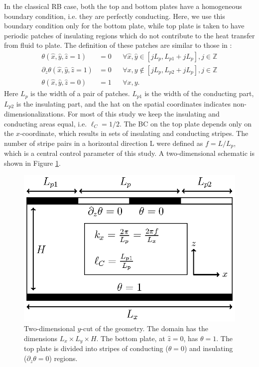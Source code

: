 \documentclass{jfm}
\begin{document}
In the classical RB case, both the top and bottom plates have a homogeneous
boundary condition, i.e. they are perfectly conducting. Here, we use this
boundary condition only for the bottom plate, while top plate is taken to have
periodic patches of insulating regions which do not contribute to the heat
transfer from fluid to plate. The definition of these patches are similar to
those in \cite{rip14}:
%
\begin{equation} \begin{aligned} \theta(\hat{x},\hat{y},\hat{z}=1) &= 0 &&
    \forall \hat{x},\hat{y} \in \left[ j L_p,L_{p1}+j L_p \right], j \in
    \mathbb{Z} \\ \partial_z \theta(\hat{x},\hat{y},\hat{z}=1)  &= 0 &&
    \forall x,y \notin \left[ j L_p,L_{p2}+j L_p \right], j \in \mathbb{Z} \\
    \theta(\hat{x},\hat{y},\hat{z}=0) &= 1 && \forall x,y.  \end{aligned}
\label{eq:boundaryConditions} \end{equation}
%
Here $L_p$ is the width of a pair of patches.  $L_{p1}$ is the width of the
conducting part, $L_{p2}$ is the insulating part, and the hat on the spatial
coordinates indicates non-dimensionalizations.  For most of this study we keep
the insulating and conducting areas equal, i.e. $\ell_C=1/2$.  The BC on the
top plate depends only on the $x$-coordinate, which results in sets of
insulating and conducting stripes.  The number of stripe pairs in a horizontal
direction L were defined as $f = L / L_p$, which is a central control
parameter of this study.
A two-dimensional schematic is shown in Figure \ref{figure1}.

\begin{figure}
\centering
\includegraphics[scale=1]{fig1.eps}
\caption{%
Two-dimensional $y$-cut of the geometry. The domain has the
dimensions $L_x \times L_y \times H$. The bottom plate, at $\hat{z}=0$,
has $\theta=1$. The top plate is divided into stripes of conducting
($\theta=0$) and insulating ($\partial_z \theta = 0$) regions.}
\label{figure1}
\end{figure}
\end{document}
